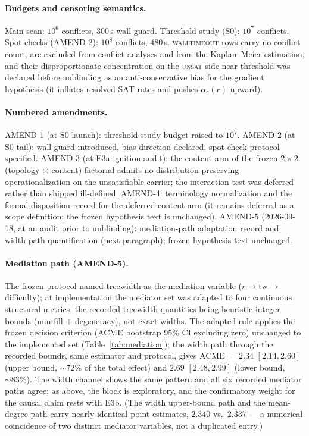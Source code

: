 \documentclass[pdflatex,sn-basic,Numbered]{sn-jnl}
\newcommand{\ac}[1]{\ensuremath{\alpha_c(#1)}}
\begin{document}
\begin{appendices}
\paragraph{Budgets and censoring semantics.}
Main scan: $10^6$ conflicts, 300\,s wall guard. Threshold study (S0):
$10^7$ conflicts. Spot-checks (AMEND-2): $10^8$ conflicts, 480\,s.
\textsc{walltimeout} rows carry no conflict count, are excluded from
conflict analyses and from the Kaplan--Meier estimation, and their
disproportionate concentration on the \textsc{unsat} side near threshold was
declared before unblinding as an anti-conservative bias for the gradient
hypothesis (it inflates resolved-SAT rates and pushes $\ac{r}$ upward).

\paragraph{Numbered amendments.}
AMEND-1 (at S0 launch): threshold-study budget raised to $10^7$.
AMEND-2 (at S0 tail): wall guard introduced, bias direction declared,
spot-check protocol specified. AMEND-3 (at E3a ignition audit): the content
arm of the frozen $2\times2$ (topology $\times$ content) factorial admits no
distribution-preserving operationalization on the unsatisfiable carrier; the
interaction test was deferred rather than shipped ill-defined. AMEND-4:
terminology normalization and the formal disposition record for the deferred
content arm (it remains deferred as a scope definition; the frozen hypothesis
text is unchanged). AMEND-5 (2026-09-18, at an audit prior to unblinding):
mediation-path adaptation record and width-path quantification (next
paragraph); frozen hypothesis text unchanged.

\paragraph{Mediation path (AMEND-5).}
The frozen protocol named treewidth as the mediation variable
($r \to \mathrm{tw} \to$ difficulty); at implementation the mediator set was
adapted to four continuous structural metrics, the recorded treewidth
quantities being heuristic integer bounds (min-fill $+$ degeneracy), not
exact widths. The adapted rule applies the frozen decision criterion (ACME
bootstrap 95\% CI excluding zero) unchanged to the implemented set
(Table~\ref{tab:mediation}); the width path through the recorded bounds,
same estimator and protocol, gives ACME $= 2.34$ $[2.14, 2.60]$ (upper
bound, ${\sim}72\%$ of the total effect) and $2.69$ $[2.48, 2.99]$ (lower
bound, ${\sim}83\%$). The width channel shows the same pattern and all six
recorded mediator paths agree; as above, the block is exploratory, and the
confirmatory weight for the causal claim rests with E3b. (The width
upper-bound path and the mean-degree path carry nearly identical point
estimates, $2.340$ vs.\ $2.337$ --- a numerical coincidence of two distinct
mediator variables, not a duplicated entry.)


\end{appendices}
\end{document}
